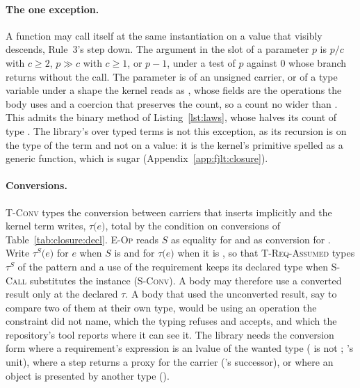 \paragraph{The one exception.}
A function may call itself at the same instantiation on a value that visibly descends, Rule~3's step down.
The argument in the slot of a parameter $p$ is $p / c$ with $c \geq 2$, $p \gg c$ with $c \geq 1$, or $p - 1$, under a test of $p$ against $0$ whose branch returns without the call.
The parameter is of an unsigned carrier, or of a type variable under a shape the kernel reads as , whose fields are the operations the body uses and a coercion  that preserves the count, so a count no wider than .
This admits the binary method of Listing~\ref{lst:laws}, whose  halves its count  of type .
The library's  over typed terms is not this exception, as its recursion is on the type of the term and not on a value: it is the kernel's primitive  spelled as a generic function, which is sugar (Appendix~\ref{app:fjlt:closure}).

\paragraph{Conversions.}
\textsc{T-Conv} types the conversion between carriers that \Cpp{} inserts implicitly and the kernel term writes, $\tau\texttt{(}e\texttt{)}$, total by the condition on conversions of Table~\ref{tab:closure:decl}.
\textsc{E-Op} reads $S$ as equality for  and as conversion for .
Write $\tau^{S}\texttt{(}e\texttt{)}$ for $e$ when $S$ is  and for $\tau\texttt{(}e\texttt{)}$ when it is , so that \textsc{T-Req-Assumed} types $\tau^{S}$ of the pattern and a use of the requirement keeps its declared type when \textsc{S-Call} substitutes the instance (\textsc{S-Conv}).
A body may therefore use a converted result only at the declared $\tau$.
A body that used the unconverted result, say to compare two of them at their own type, would be using an operation the constraint did not name, which the typing refuses and \Cpp{} accepts, and which the repository's tool reports where it can see it.
The library needs the conversion form where a requirement's expression is an lvalue of the wanted type ( is not ; 's unit), where a step returns a proxy for the carrier ('s successor), or where an object is presented by another type ().

